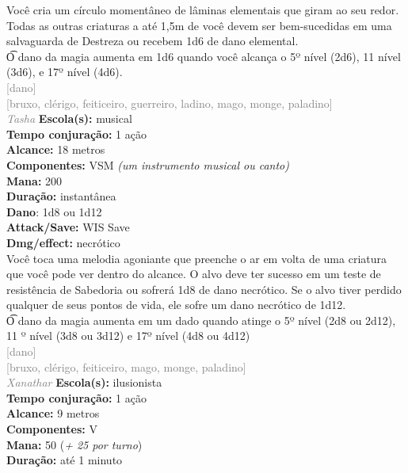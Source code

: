 \documentclass{RPG_Adventure}[2021/10/20]
\begin{document}
{\normalsize Você cria um círculo momentâneo de lâminas elementais que giram ao seu redor. Todas as outras criaturas a até 1,5m de você devem ser bem-sucedidas em uma salvaguarda de Destreza ou recebem 1d6 de dano elemental.\\\t O dano da magia aumenta em 1d6 quando você alcança o 5º nível (2d6), 11 nível (3d6), e 17º nível (4d6).\\}
{\scriptsize \textcolor{gray}{[dano]\\}}
{\scriptsize \textcolor{gray}{[bruxo, clérigo, feiticeiro, guerreiro, ladino, mago, monge, paladino]\\}}
{\tiny \textcolor{gray}{\textit{Tasha}}}
{\small \t \textbf{Escola(s):} musical\\\t \textbf{Tempo conjuração:} 1 ação\\\t \textbf{Alcance:} 18 metros\\\t \textbf{Componentes:} VSM \textit{(um instrumento musical ou canto)}\\\t \textbf{Mana:} 200\\\t \textbf{Duração:} instantânea\\\t \textbf{Dano}: 1d8 ou 1d12\\\t \textbf{Attack/Save:} WIS Save\\\t \textbf{Dmg/effect:} necrótico\\}
{\normalsize Você toca uma melodia agoniante que preenche o ar em volta de uma criatura que você pode ver dentro do alcance. O alvo deve ter sucesso em um teste de resistência de Sabedoria ou sofrerá 1d8 de dano necrótico. Se o alvo tiver perdido qualquer de seus pontos de vida, ele sofre um dano necrótico de 1d12.\\\t O dano da magia aumenta em um dado quando atinge o 5º nível (2d8 ou 2d12), 11 º nível (3d8 ou 3d12) e 17º nível (4d8 ou 4d12)\\}
{\scriptsize \textcolor{gray}{[dano]\\}}
{\scriptsize \textcolor{gray}{[bruxo, clérigo, feiticeiro, mago, monge, paladino]\\}}
{\tiny \textcolor{gray}{\textit{Xanathar}}}
{\small \t \textbf{Escola(s):} ilusionista\\\t \textbf{Tempo conjuração:} 1 ação\\\t \textbf{Alcance:} 9 metros\\\t \textbf{Componentes:} V\\\t \textbf{Mana:} 50 (\textit{+ 25 por turno})\\\t \textbf{Duração:} até 1 minuto\\}
\end{document}

